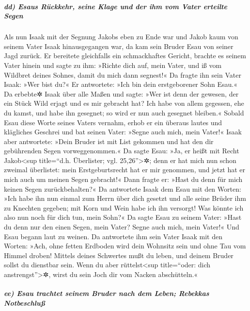 \hypertarget{dd-esaus-ruxfcckkehr-seine-klage-und-der-ihm-vom-vater-erteilte-segen}{%
\subparagraph{dd) Esaus Rückkehr, seine Klage und der ihm vom Vater
erteilte
Segen}\label{dd-esaus-ruxfcckkehr-seine-klage-und-der-ihm-vom-vater-erteilte-segen}}

 Als nun Isaak mit der Segnung Jakobs eben zu Ende war
und Jakob kaum von seinem Vater Isaak hinausgegangen war, da kam sein
Bruder Esau von seiner Jagd zurück.  Er bereitete
gleichfalls ein schmackhaftes Gericht, brachte es seinem Vater hinein
und sagte zu ihm: »Richte dich auf, mein Vater, und iß vom Wildbret
deines Sohnes, damit du mich dann segnest!«  Da fragte
ihn sein Vater Isaak: »Wer bist du?« Er antwortete: »Ich bin dein
erstgeborener Sohn Esau.«  Da erbebte✲ Isaak über alle
Maßen und sagte: »Wer ist denn der gewesen, der ein Stück Wild erjagt
und es mir gebracht hat? Ich habe von allem gegessen, ehe du kamst, und
habe ihn gesegnet; so wird er nun auch gesegnet bleiben.«
 Sobald Esau diese Worte seines Vaters vernahm, erhob er
ein überaus lautes und klägliches Geschrei und bat seinen Vater: »Segne
auch mich, mein Vater!«  Isaak aber antwortete: »Dein
Bruder ist mit List gekommen und hat den dir gebührenden Segen
vorweggenommen.«  Da sagte Esau: »Ja, er heißt mit Recht
Jakob\textless sup title=``d.h. Überlister; vgl. 25,26''\textgreater✲;
denn er hat mich nun schon zweimal überlistet: mein Erstgeburtsrecht hat
er mir genommen, und jetzt hat er mich auch um meinen Segen gebracht!«
Dann fragte er: »Hast du denn für mich keinen Segen zurückbehalten?«
 Da antwortete Isaak dem Esau mit den Worten: »Ich habe
ihn nun einmal zum Herrn über dich gesetzt und alle seine Brüder ihm zu
Knechten gegeben; mit Korn und Wein habe ich ihn versorgt! Was könnte
ich also nun noch für dich tun, mein Sohn?«  Da sagte
Esau zu seinem Vater: »Hast du denn nur den einen Segen, mein Vater?
Segne auch mich, mein Vater!« Und Esau begann laut zu weinen.
 Da antwortete ihm sein Vater Isaak mit den Worten: »Ach,
ohne fetten Erdboden wird dein Wohnsitz sein und ohne Tau vom Himmel
droben!  Mittels deines Schwertes mußt du leben, und
deinem Bruder sollst du dienstbar sein. Wenn du aber
rüttelst\textless sup title=``oder: dich anstrengst''\textgreater✲,
wirst du sein Joch dir vom Nacken abschütteln.«

\hypertarget{ee-esau-trachtet-seinem-bruder-nach-dem-leben-rebekkas-notbeschluuxdf}{%
\subparagraph{ee) Esau trachtet seinem Bruder nach dem Leben; Rebekkas
Notbeschluß}\label{ee-esau-trachtet-seinem-bruder-nach-dem-leben-rebekkas-notbeschluuxdf}}


